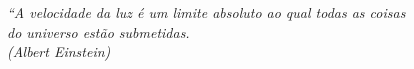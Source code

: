 
\vspace*{\fill}
	\begin{flushright}
		\textit{``A velocidade da luz é um limite absoluto ao qual todas as coisas\\
			do universo estão submetidas.\\
			(Albert Einstein)}
	\end{flushright}
